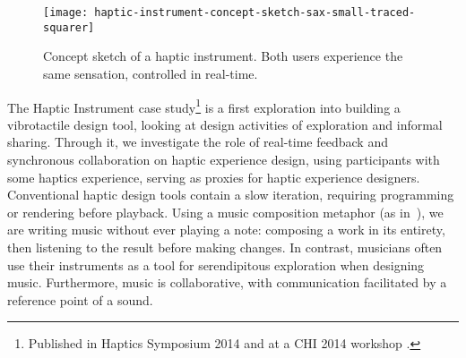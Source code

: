 \begin{figure}[h] %
   \centering
   \texttt{[image: haptic-instrument-concept-sketch-sax-small-traced-squarer]} 
   \caption{Concept sketch of a haptic instrument. Both users experience the same sensation, controlled in real-time.}
   \label{fig:HapticInstrumentConceptSketch}
\end{figure}

The Haptic Instrument case study\footnote{Published in Haptics Symposium 2014 \cite{Schneider2014} and at a CHI 2014 workshop \cite{Schneider2014b}.} is a first exploration into building a vibrotactile design tool, looking at design activities of exploration and informal sharing.
Through it, we investigate the role of real-time feedback and synchronous collaboration on haptic experience design, using participants with some haptics experience, serving as proxies for haptic experience designers.
Conventional haptic design tools contain a slow iteration, requiring programming or rendering before playback.
Using a music composition metaphor (as in~\cite{Lee2009}), we are writing music without ever playing a note: composing a work in its entirety, then listening to the result before making changes.
In contrast, musicians often use their instruments as a tool for serendipitous exploration when designing music.
Furthermore, music is collaborative, with communication facilitated by a reference point of a sound.







